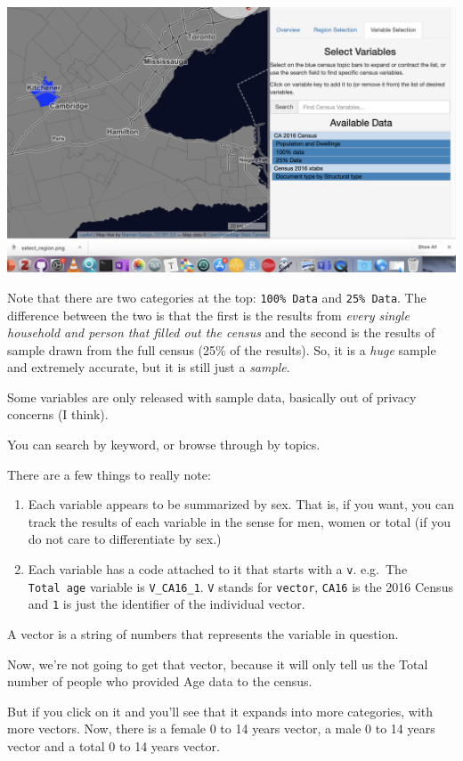 \documentclass[
]{article}
\begin{document}
\begin{center}\includegraphics[width=0.5\linewidth]{images/select_kitchener_variables} \end{center}

Note that there are two categories at the top: \texttt{100\%\ Data} and
\texttt{25\%\ Data}. The difference between the two is that the first is
the results from \emph{every single household and person that filled out
the census} and the second is the results of sample drawn from the full
census (25\% of the results). So, it is a \emph{huge} sample and
extremely accurate, but it is still just a \emph{sample}.

Some variables are only released with sample data, basically out of
privacy concerns (I think).

You can search by keyword, or browse through by topics.

There are a few things to really note:

\begin{enumerate}
\def\labelenumi{\arabic{enumi}.}
\item
  Each variable appears to be summarized by sex. That is, if you want,
  you can track the results of each variable in the sense for men, women
  or total (if you do not care to differentiate by sex.)
\item
  Each variable has a code attached to it that starts with a \texttt{v}.
  e.g.~The \texttt{Total\ age} variable is \texttt{V\_CA16\_1}.
  \texttt{V} stands for \texttt{vector}, \texttt{CA16} is the 2016
  Census and \texttt{1} is just the identifier of the individual vector.
\end{enumerate}

A vector is a string of numbers that represents the variable in
question.

Now, we're not going to get that vector, because it will only tell us
the Total number of people who provided Age data to the census.

But if you click on it and you'll see that it expands into more
categories, with more vectors. Now, there is a female 0 to 14 years
vector, a male 0 to 14 years vector and a total 0 to 14 years vector.
\end{document}
